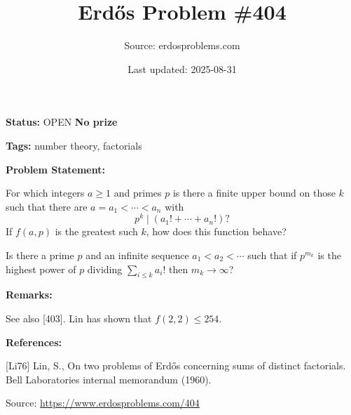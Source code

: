 \documentclass{article}
\title{Erd\H{o}s Problem \#404}
\date{Last updated: 2025-08-31}
\author{Source: erdosproblems.com}
\begin{document}
\maketitle

\noindent\textbf{Status:} OPEN \quad \textbf{No prize}

\noindent\textbf{Tags:} number theory, factorials

\medskip
\noindent\textbf{Problem Statement:}

For which integers $a\geq 1$ and primes $p$ is there a finite upper bound on those $k$ such that there are $a=a_1<\cdots<a_n$ with\[p^k \mid (a_1!+\cdots+a_n!)?\]If $f(a,p)$ is the greatest such $k$, how does this function behave?

Is there a prime $p$ and an infinite sequence $a_1<a_2<\cdots$ such that if $p^{m_k}$ is the highest power of $p$ dividing $\sum_{i\leq k}a_i!$ then $m_k\to \infty$?

\bigskip
\noindent\textbf{Remarks:}

See also [403]. Lin \cite{Li76} has shown that $f(2,2) \leq 254$.

\bigskip
\noindent\textbf{References:}

[Li76] Lin, S., On two problems of Erd\H{o}s concerning sums of distinct factorials. Bell Laboratories internal memorandum (1960).

\bigskip
\noindent\small{Source: \url{https://www.erdosproblems.com/404}}
\end{document}
